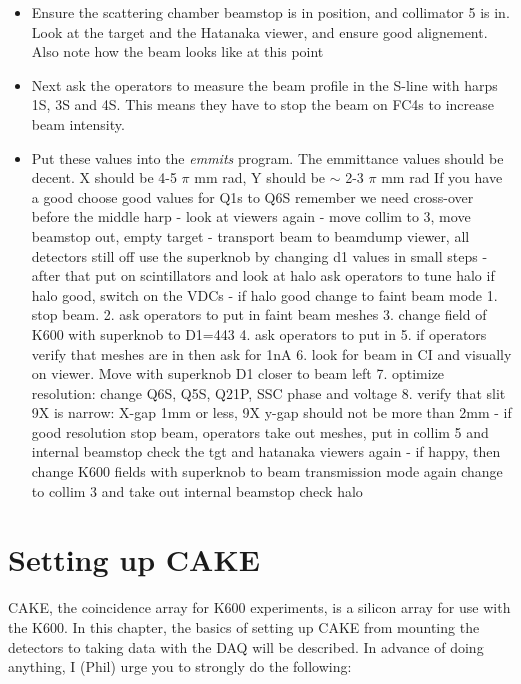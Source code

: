 \documentclass[11pt]{report}
\begin{document}
\begin{itemize}  
\item Ensure the scattering chamber beamstop is in position, and collimator 5 is in.
Look at the target and the Hatanaka viewer, and ensure good alignement. Also note
how the beam looks like at this point
\item Next ask the operators to measure the beam profile in the S-line with harps
1S, 3S and 4S. This means they have to stop the beam on FC4s to increase beam intensity.
\item Put these values into the {\it emmits} program. 
The emmittance values should be decent.
X should be 4-5 $\pi$ mm rad, Y should be $\sim$ 2-3 $\pi$ mm rad
If you have a good 
   choose good values for Q1s to Q6S
 remember we need cross-over before the middle harp
- look at viewers again
- move collim to 3, move beamstop out, empty target
- transport beam to beamdump viewer, all detectors still off
  use the superknob by changing d1 values in small steps
- after that put on scintillators and look at halo
   ask operators to tune halo
   if halo good, switch on the VDCs 
- if halo good change to faint beam mode
    1. stop beam.
    2. ask operators to put in faint beam meshes
    3. change field of K600 with superknob to D1=443
    4. ask operators to put in  
    5. if operators verify that meshes are in then ask for 1nA
    6. look for beam in CI and visually on viewer. Move with superknob D1 closer to beam left
    7. optimize resolution: change Q6S, Q5S, Q21P, SSC phase and voltage
    8. verify that slit 9X is narrow: X-gap 1mm or less, 9X y-gap should not be more than 2mm
-  if good resolution 
    stop beam, operators take out meshes, put in collim 5 and internal beamstop
    check the tgt and hatanaka viewers again
-  if happy, then change K600 fields with superknob  to beam transmission mode again
    change to collim 3 and take out internal beamstop
   check halo
\end{itemize}

\chapter{Setting up CAKE}

CAKE, the coincidence array for K600 experiments, is a silicon array for use with the K600. In this chapter, the basics of setting up CAKE from mounting the detectors to taking data with the DAQ will be described. In advance of doing anything, I (Phil) urge you to strongly do the following:
\end{document}
